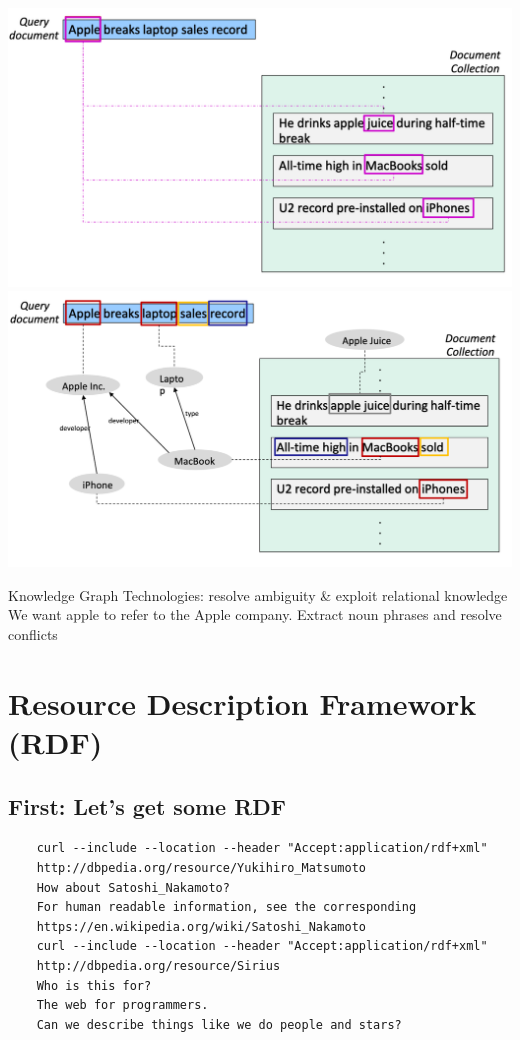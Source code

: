 \documentclass[11pt]{article}
\theoremstyle{definition}
\begin{document}
\includegraphics[width=\textwidth/2-2.08049pt]{4.png}
\includegraphics[width=\textwidth/2]{5.png}

Knowledge Graph Technologies:
resolve ambiguity \& exploit relational knowledge
We want apple to refer to the Apple company.
Extract noun phrases and resolve conflicts

\section{Resource Description
Framework (RDF)}

\subsection{First: Let’s get some RDF}

\begin{verbatim}
    curl --include --location --header "Accept:application/rdf+xml"
    http://dbpedia.org/resource/Yukihiro_Matsumoto
    How about Satoshi_Nakamoto?
    For human readable information, see the corresponding
    https://en.wikipedia.org/wiki/Satoshi_Nakamoto
    curl --include --location --header "Accept:application/rdf+xml"    
    http://dbpedia.org/resource/Sirius
    Who is this for?
    The web for programmers.
    Can we describe things like we do people and stars?
\end{verbatim}
 
\end{document}
